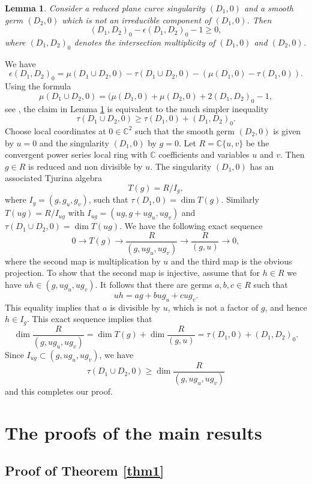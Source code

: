 \documentclass[12pt]{amsart}
\theoremstyle{plain}
\newtheorem{lem}[subsection]{Lemma}
\theoremstyle{definition}
\numberwithin{equation}{section}
\newcommand{\C}{\mathbb{C}}
\begin{document}
\begin{lem}
\label{lem2}
Consider a reduced plane curve singularity $(D_1,0)$ and a smooth germ $(D_2,0)$ which is not an irreducible component of $(D_1,0)$.
Then
$$(D_1,D_2)_0-\epsilon(D_1,D_2)_0-1 \geq 0,$$
where $(D_1,D_2)_0$ denotes the intersection multiplicity of $(D_1,0)$ and $(D_2,0)$.
\end{lem}
\proof
We have
$$\epsilon(D_1,D_2)_0=\mu(D_1 \cup D_2,0) -\tau(D_1 \cup D_2,0)-(\mu(D_1,0) -\tau(D_1,0)).$$
Using the formula
$$\mu(D_1 \cup D_2,0) =(\mu(D_1,0)+\mu( D_2,0)+ 2(D_1,D_2)_0-1,$$
see \cite[Theorem 6.5.1]{CTC}, the claim in Lemma \ref{lem2}  is equivalent to the much simpler inequality
$$\tau(D_1\cup D_2,0) \geq \tau(D_1,0) + (D_1,D_2)_0.$$
Choose local coordinates at $0 \in \C^2$ such that the smooth germ $(D_2,0)$ is given by $u=0$ and the singularity $(D_1,0)$ by $g=0$.
Let $R=\C\{u,v\}$ be the convergent power series local ring with $\C$ coefficients and variables $u$ and $v$.  Then $g\in R$ is reduced and non divisible by $u$. The singularity $(D_1,0)$ has an associated Tjurina algebra
$$T(g)=R/I_g,$$
where $I_g=(g,g_u,g_v)$, such that $\tau(D_1,0)=\dim T(g)$. Similarly
$T(ug)=R/I_{ug}$ with $I_{ug}=(ug,g+ug_u,ug_v)$ and $\tau(D_1 \cup D_2,0)=\dim T(ug)$. We have the following exact sequence
$$0 \to T(g) \to \frac{R}{(g,ug_u,ug_v)} \to  \frac{R}{(g,u)} \to 0,$$
where the second map is multiplication by $u$ and the third map is the obvious projection. To show that the second map is injective, assume that for $h \in R$ we have $uh \in (g,ug_u,ug_v)$. It follows that there are germs $a,b,c \in R$ such that
$$uh=ag+bug_u+cug_v.$$
This equality implies that $a$ is divisible by $u$, which is not a factor of $g$, and hence $h \in I_g$. This exact sequence implies that
$$\dim \frac{R}{(g,ug_u,ug_v)}=\dim T(g)+\dim \frac{R}{(g,u)}=\tau(D_1,0)+(D_1,D_2)_0.$$
Since $I_{ug} \subset (g,ug_u,ug_v)$, we have
$$\tau(D_1\cup D_2,0) \geq \dim \frac{R}{(g,ug_u,ug_v)}$$
and this completes our proof.

\endproof




\section{The proofs of the  main results} 

\subsection{Proof of Theorem \ref{thm1}} 
\end{document}
